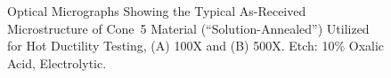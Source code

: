 \begin{figure}
\centering
{}

\caption[Optical Micrographs Showing the Typical As-Received Microstructure of Cone~5 Material.]{Optical Micrographs Showing the Typical As-Received Microstructure of Cone~5 Material (``Solution-Annealed'') Utilized for Hot Ductility Testing, (A) 100X and (B) 500X.  Etch: 10\% Oxalic Acid, Electrolytic.}
\label{fig:c5-asreceived}
\end{figure}


